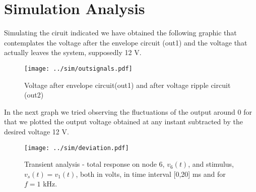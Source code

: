 \section{Simulation Analysis}

Simulating the ciruit indicated we have obtained the following graphic that contemplates the voltage after the envelope circuit (out1) and the voltage that actually leaves the system, supposedly 12 V.

\begin{figure}[H]
  \centering
  \small
  \texttt{[image: ../sim/outsignals.pdf]}
  \caption{Voltage after envelope circuit(out1) and after voltage ripple circuit (out2)}
  \label{fig:out1_out2}
\end{figure}


In the next graph we tried observing the fluctuations of the output around 0 for that we plotted the output voltage obtained at any instant subtracted by the desired voltage 12 V.

\begin{figure}[H]
  \centering
  \texttt{[image: ../sim/deviation.pdf]}
  \vspace{-5mm}
  \caption{Transient analysis - total response on node 6, $v_6(t)$, and stimulus, $v_s(t)=v_1(t)$, both in volts, in time interval [0,20] ms and for $f=1$ kHz.}
  \label{fig:Ex4_Image}
\end{figure}




